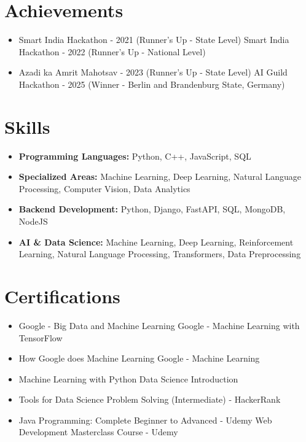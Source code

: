 \documentclass[a4paper,10pt]{article}
\begin{document}
\section*{Achievements}
\begin{itemize}
\item Smart India Hackathon - 2021 (Runner's Up - State Level) \hfill Smart India Hackathon - 2022 (Runner's Up - National Level)
\item Azadi ka Amrit Mahotsav - 2023 (Runner's Up - State Level) \hfill AI Guild Hackathon - 2025 (Winner - Berlin and Brandenburg State, Germany)
\end{itemize}

\section*{Skills}
\begin{itemize}
  \item \textbf{Programming Languages:} Python, C++, JavaScript, SQL
  \item \textbf{Specialized Areas:} Machine Learning, Deep Learning, Natural Language Processing, Computer Vision, Data Analytics
  \item \textbf{Backend Development:} Python, Django, FastAPI, SQL, MongoDB, NodeJS
  \item \textbf{AI \& Data Science:} Machine Learning, Deep Learning, Reinforcement Learning, Natural Language Processing, Transformers, Data Preprocessing
\end{itemize}

\section*{Certifications}
\begin{itemize}
\item Google - Big Data and Machine Learning \hfill Google - Machine Learning with TensorFlow
\item How Google does Machine Learning \hfill Google - Machine Learning
\item Machine Learning with Python \hfill Data Science Introduction
\item Tools for Data Science \hfill Problem Solving (Intermediate) - HackerRank
\item Java Programming: Complete Beginner to Advanced - Udemy \hfill Web Development Masterclass Course - Udemy
\end{itemize}
\end{document}
